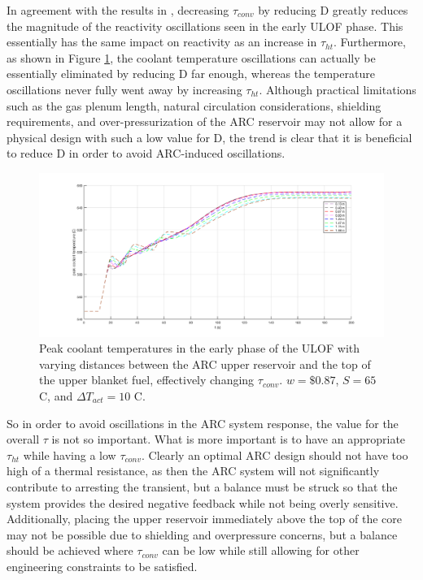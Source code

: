 \documentclass[11pt, oneside]{article}   	%
\begin{document}
In agreement with the results in \cite{ARC_Annals}, decreasing $\tau_{conv}$ by reducing D greatly reduces the magnitude of the reactivity oscillations seen in the early ULOF phase.
This essentially has the same impact on reactivity as an increase in $\tau_{ht}$.
Furthermore, as shown in Figure \ref{fig:tempWithD}, the coolant temperature oscillations can actually be essentially eliminated by reducing D far enough, whereas the temperature oscillations never fully went away by increasing $\tau_{ht}$.
Although practical limitations such as the gas plenum length, natural circulation considerations, shielding requirements, and over-pressurization of the ARC reservoir may not allow for a physical design with such a low value for D, the trend is clear that it is beneficial to reduce D in order to avoid ARC-induced oscillations.

\begin{figure}[h!]
\includegraphics[width=18cm]{tempWithD}
\centering
\caption{Peak coolant temperatures in the early phase of the ULOF with varying distances between the ARC upper reservoir and the top of the upper blanket fuel, effectively changing $\tau_{conv}$. $w=\$0.87$, $S=65$ C, and $\Delta T_{act}=10$ C.}
\label{fig:tempWithD}
\end{figure}

So in order to avoid oscillations in the ARC system response, the value for the overall $\tau$ is not so important.
What is more important is to have an appropriate $\tau_{ht}$ while having a low $\tau_{conv}$.
Clearly an optimal ARC design should not have too high of a thermal resistance, as then the ARC system will not significantly contribute to arresting the transient, but a balance must be struck so that the system provides the desired negative feedback while not being overly sensitive.
Additionally, placing the upper reservoir immediately above the top of the core may not be possible due to shielding and overpressure concerns, but a balance should be achieved where $\tau_{conv}$ can be low while still allowing for other engineering constraints to be satisfied.
\end{document}
